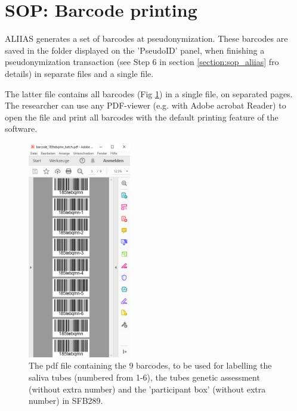 \pagebreak

\section{SOP: Barcode printing}
\label{section:sop_barcode}

ALIIAS generates a set of barcodes at pseudonymization. These barcodes are saved in the folder displayed on the 'PseudoID' panel, when finishing a pseudonymization transaction (see Step 6 in section \ref{section:sop_aliias} fro details) in separate  files and a single  file.

The latter file contains all barcodes (Fig \ref{fig:barcodes}) in a single file, on separated pages. The researcher can use any PDF-viewer (e.g. with Adobe acrobat Reader) to open the file and print all barcodes with the default printing feature of the software.


\begin{figure}[H]
\centering
\includegraphics[width=0.4\textwidth]{docs/fig/09_barcodes.PNG}
\caption{The pdf file containing the 9 barcodes, to be used for labelling the saliva tubes (numbered from 1-6), the tubes genetic assessment (without extra number) and the 'participant box' (without extra number) in SFB289.}
\label{fig:barcodes}
\end{figure}
